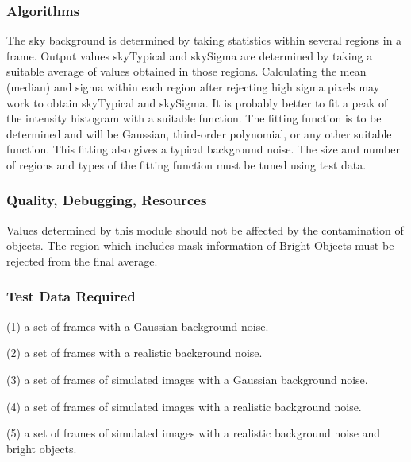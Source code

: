 \subsubsection {Algorithms}

The sky background is determined by taking statistics within
several regions in a frame. Output values skyTypical and skySigma 
are determined by taking a suitable average of values obtained
in those regions. 
Calculating the mean (median) and sigma within each region after rejecting 
high sigma pixels may work to obtain skyTypical and skySigma. 
It is probably better to fit a peak of the intensity histogram with
a suitable function.  The fitting function is to be determined and 
will be Gaussian, third-order polynomial, or any other suitable function. 
This fitting also gives a typical background noise.
The size and number of regions and types of the fitting function 
must be tuned using test data.

\subsubsection {Quality, Debugging, Resources}

Values determined by this module should not be affected by
the contamination of objects.
The region which includes mask information of Bright Objects
must be rejected from the final average. 

\subsubsection {Test Data Required}

\begin{description}
\item{\quad} (1) a set of frames with a Gaussian background noise.
\item{\quad} (2) a set of frames with a realistic background noise.
\item{\quad} (3) a set of frames of simulated images with a 
                    Gaussian background noise.
\item{\quad} (4) a set of frames of simulated images with a 
                    realistic background noise.
\item{\quad} (5) a set of frames of simulated images with a 
                    realistic background noise and bright objects.
\end{description}

